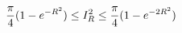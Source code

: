 \documentclass[preview]{standalone}
\begin{document}
\begin{align*}
\special{dvisvgm:raw <g id='unique000'>}\frac{\pi}{4}(1-e^{-R^2})\le I_R^2\le\frac{\pi}{4}(1-e^{-2R^2})\special{dvisvgm:raw </g>}
\end{align*}
\end{document}
